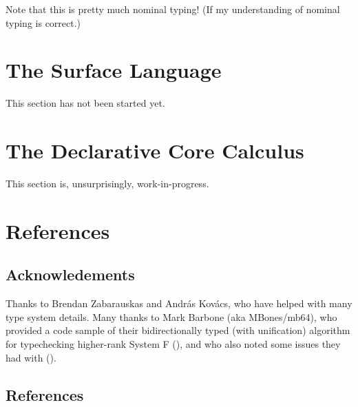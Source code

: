 \documentclass[11pt]{article}
\begin{document}
Note that this is pretty much nominal typing! (If my understanding of nominal
    typing is correct.)


\section{The Surface Language}

This section has not been started yet.

\section{The Declarative Core Calculus}

This section is, unsurprisingly, work-in-progress.

\section{References}

\subsection{Acknowledements}

Thanks to Brendan Zabarauskas and András Kovács, who have helped with many type
    system details. Many thanks to Mark Barbone (aka MBones/mb64), who provided
    a code sample of their bidirectionally typed (with unification) algorithm
    for typechecking higher-rank System F (\cite{tychk-nbe}), and who also
    noted some issues they had with 
    (\cite{Dunfield13:bidir}).


\subsection{References}

\nocite{*}

\printbibliography[heading=none]
\end{document}
